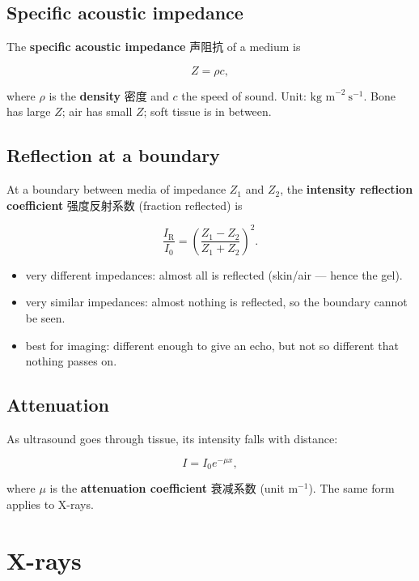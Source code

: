 \documentclass[11pt]{article}
\begin{document}
\subsection*{Specific acoustic impedance}

The \textbf{specific acoustic impedance} 声阻抗 of a medium is

\[
Z = \rho c,
\]

where $\rho$ is the \textbf{density} 密度 and $c$ the speed of sound. Unit: $\text{kg m}^{-2}\ \text{s}^{-1}$. Bone has large $Z$; air has small $Z$; soft tissue is in between.

\subsection*{Reflection at a boundary}

At a boundary between media of impedance $Z_{1}$ and $Z_{2}$, the \textbf{intensity reflection coefficient} 强度反射系数 (fraction reflected) is

\[
\frac{I_{\text{R}}}{I_{0}} = \left(\frac{Z_{1} - Z_{2}}{Z_{1} + Z_{2}}\right)^{2}.
\]

\begin{itemize}
\item very different impedances: almost all is reflected (skin/air — hence the gel).

\item very similar impedances: almost nothing is reflected, so the boundary cannot be seen.

\item best for imaging: different enough to give an echo, but not so different that nothing passes on.

\end{itemize}

\subsection*{Attenuation}

As ultrasound goes through tissue, its intensity falls with distance:

\[
I = I_{0} e^{-\mu x},
\]

where $\mu$ is the \textbf{attenuation coefficient} 衰减系数 (unit $\text{m}^{-1}$). The same form applies to X-rays.

\section*{X-rays}
\end{document}

